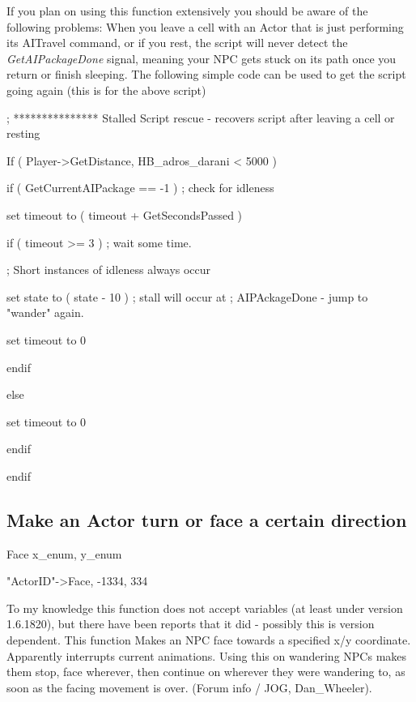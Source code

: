 \documentclass[
]{article}
\begin{document}
If you plan on using this function extensively you should be aware of
the following problems: When you leave a cell with an Actor that is just
performing its AITravel command, or if you rest, the script will never
detect the \emph{GetAIPackageDone} signal, meaning your NPC gets stuck
on its path once you return or finish sleeping. The following simple
code can be used to get the script going again (this is for the above
script)


; *************** Stalled Script rescue - recovers script after leaving
a cell or resting

If ( Player-\textgreater GetDistance, HB\_adros\_darani \textless{} 5000
)

if ( GetCurrentAIPackage == -1 ) ; check for idleness

set timeout to ( timeout + GetSecondsPassed )

if ( timeout \textgreater= 3 ) ; wait some time.

; Short instances of idleness always occur

set state to ( state - 10 ) ; stall will occur at ; AIPAckageDone - jump
to "wander" again.

set timeout to 0

endif

else

set timeout to 0

endif

endif

\hypertarget{make-an-actor-turn-or-face-a-certain-direction}{%
\subsection{Make an Actor turn or face a certain
direction}\label{make-an-actor-turn-or-face-a-certain-direction}}

Face x\_enum, y\_enum

"ActorID"-\textgreater Face, -1334, 334

To my knowledge this function does not accept variables (at least under
version 1.6.1820), but there have been reports that it did - possibly
this is version dependent. This function Makes an NPC face towards a
specified x/y coordinate. Apparently interrupts current animations.
Using this on wandering NPCs makes them stop, face wherever, then
continue on wherever they were wandering to, as soon as the facing
movement is over. (Forum info / JOG, Dan\_Wheeler).
\end{document}
